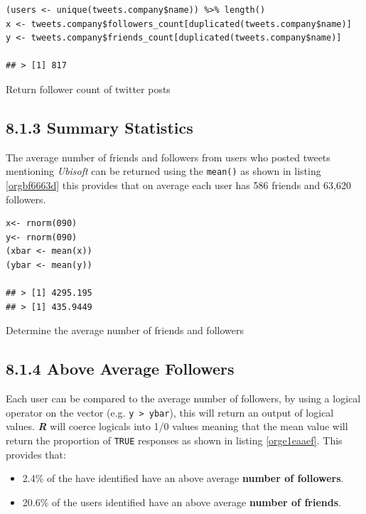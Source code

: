 \documentclass[11pt]{article}
\begin{document}
\begin{listing}[htbp]
\begin{verbatim}
(users <- unique(tweets.company$name)) %>% length()
x <- tweets.company$followers_count[duplicated(tweets.company$name)]
y <- tweets.company$friends_count[duplicated(tweets.company$name)]

## > [1] 817
\end{verbatim}
\caption{\label{org76d7dec}Return follower count of twitter posts}
\end{listing}


\subsection{8.1.3 Summary Statistics}
\label{sec:orgc4aa247}
The average number of friends and followers from users who posted tweets mentioning \emph{Ubisoft} can be returned using the \texttt{mean()} as shown in listing \ref{orgbf6663d}
this provides that on average each user has 586 friends and 63,620 followers.

\begin{listing}[htbp]
\begin{verbatim}
x<- rnorm(090)
y<- rnorm(090)
(xbar <- mean(x))
(ybar <- mean(y))

## > [1] 4295.195
## > [1] 435.9449
\end{verbatim}
\caption{\label{orgbf6663d}Determine the average number of friends and followers}
\end{listing}

\subsection{8.1.4 Above Average Followers}
\label{sec:org06037ea}
Each user can be compared to the average number of followers, by using a logical
operator on the vector (e.g. \texttt{y > ybar}), this will return an output of logical
values. \textbf{\emph{R}} will coerce logicals into 1/0 values meaning that the mean value
will return the proportion of \texttt{TRUE} responses as shown in listing \ref{orge1eaaef}. This
provides that:

\begin{itemize}
\item 2.4\%  of the have identified have an above average \textbf{number of followers}.
\item 20.6\% of the users identified have an above average \textbf{number of friends}.
\end{itemize}
\end{document}
